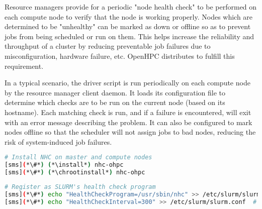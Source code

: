 Resource managers provide for a periodic "node health check" to be performed on
each compute node to verify that the node is working properly. Nodes which are
determined to be "unhealthy" can be marked as down or offline so as to prevent
jobs from being scheduled or run on them. This helps increase the reliability
and throughput of a cluster by reducing preventable job failures due to
misconfiguration, hardware failure, etc. OpenHPC distributes \nhc{} to fulfill
this requirement. 

In a typical scenario, the \nhc{} driver script is run periodically on each compute
node by the resource manager client daemon. It loads its
configuration file to determine which checks are to be run on the current node
(based on its hostname). Each matching check is run, and if a failure is
encountered, \nhc{} will exit with an error message describing the problem. It can
also be configured to mark nodes offline so that the scheduler will not assign
jobs to bad nodes, reducing the risk of system-induced job failures. 

\begin{lstlisting}[language=bash,keywords={},upquote=true]
# Install NHC on master and compute nodes
[sms](*\#*) (*\install*) nhc-ohpc
[sms](*\#*) (*\chrootinstall*) nhc-ohpc
\end{lstlisting}

\begin{lstlisting}[language=bash,keywords={},upquote=true]
# Register as SLURM's health check program
[sms](*\#*) echo "HealthCheckProgram=/usr/sbin/nhc" >> /etc/slurm/slurm.conf
[sms](*\#*) echo "HealthCheckInterval=300" >> /etc/slurm/slurm.conf  # execute every five minutes
\end{lstlisting}
\fi

